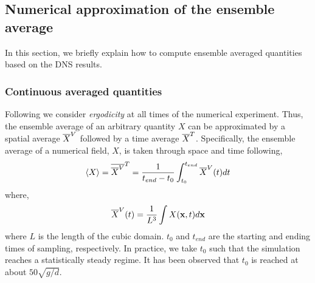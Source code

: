 \subsection{Numerical approximation of the ensemble average}

In this section, we briefly explain how to compute ensemble averaged quantities based on the DNS results. 

\subsubsection{Continuous averaged quantities}

Following \citet{du2022analysis} we consider \textit{ergodicity} at all times of the numerical experiment.
Thus, the ensemble average of an arbitrary quantity $X$ can be approximated by a spatial average $\overline{X}^V$ followed by a time average $\overline{X}^T$. 
Specifically, the ensemble average of a numerical field, $X$, is taken through space and time following,
\begin{equation}
    \left<X\right>
    = \overline{\overline{X}^V}^T
    = \frac{1}{ t_{end} - t_0}\int_{t_0}^{t_{end}} 
    \overline{X}^V(t) dt
\end{equation}
where, 
\begin{equation}
    \overline{X}^V(t)
    = \frac{1}{L^3}\int 
    X(\textbf{x},t) d\textbf{x}
\end{equation}
where $L$ is the length of the cubic domain.
$t_0$ and $t_{end}$ are the starting and ending times of sampling, respectively.
In practice, we take $t_0$ such that the simulation reaches a statistically steady regime.  
It has been observed that $t_0$ is reached at about $50 \sqrt{g/d}$. 

